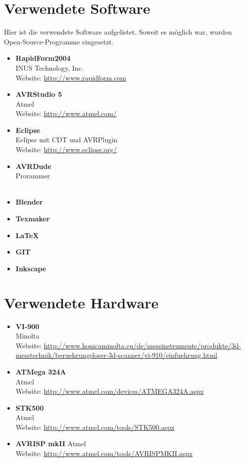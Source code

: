 \section{Verwendete Software}
\label{sec:V_Software}
Hier ist die verwendete Software aufgelistet. Soweit es möglich war, wurden Open-Source-Programme eingesetzt.
\begin{itemize}
\item \textbf{RapidForm2004} \\
INUS Technology, Inc.\\
Website: \url{http://www.rapidform.com}
\item \textbf{AVRStudio 5} \\
Atmel \\
Website: \url{http://www.atmel.com/}  
\item \textbf{Eclipse} \\
Eclipse mit CDT und AVRPlugin
\\
Website: \url{http://www.eclipse.org/}  
\item \textbf{AVRDude} \\
Prorammer \\
\\
\item \textbf{Blender}\\
\item \textbf{Texmaker}\\
\item \textbf{LaTeX}\\
\item \textbf{GIT}\\
\item \textbf{Inkscape}
\end{itemize}

\section{Verwendete Hardware}
\label{sec:V_Hardware}
\begin{itemize}
\item \textbf{VI-900}\\
Minolta\\
Website: \url{http://www.konicaminolta.eu/de/messinstrumente/produkte/3d-messtechnik/beruehrungsloser-3d-scanner/vi-910/einfuehrung.html}
\item \textbf{ATMega 324A}\\
Atmel\\
Website: \url{http://www.atmel.com/devices/ATMEGA324A.aspx}
\item \textbf{STK500}\\
Atmel\\
Website: \url{http://www.atmel.com/tools/STK500.aspx}
\item \textbf{AVRISP mkII}
Atmel\\
Website: \url{http://www.atmel.com/tools/AVRISPMKII.aspx}
\end{itemize}